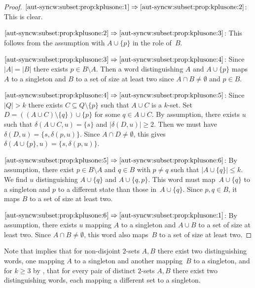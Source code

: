 \begin{proof}
	$\ref{aut-syncw:subset:prop:kplusone:1} \Rightarrow \ref{aut-syncw:subset:prop:kplusone:2}$: This is clear.	
	
	$\ref{aut-syncw:subset:prop:kplusone:2} \Rightarrow \ref{aut-syncw:subset:prop:kplusone:3}$: This follows from the assumption with $A \cup \{p\}$ in the role of~$B$.
	
	$\ref{aut-syncw:subset:prop:kplusone:3} \Rightarrow \ref{aut-syncw:subset:prop:kplusone:4}$: Since $|A| = |B|$
	there exists $p \in B \setminus A$.
	Then a word distinguishing $A$ and $A \cup \{p\}$
	maps $A$ to a singleton and $B$ to a set of size at least two
	since $A \cap B \ne \emptyset$ and $p \in B$.
	
	$\ref{aut-syncw:subset:prop:kplusone:4} \Rightarrow \ref{aut-syncw:subset:prop:kplusone:5}$: Since $|Q| > k$
	there exists $C \subseteq Q \setminus \{p\}$ such that $A \cup C$ is a $k$-set.
	Set $D = ( ( A \cup C ) \setminus \{q\} ) \cup \{p\}$ for some $q \in A \cup C$.	
	By assumption, there exists $u$ such that $\delta(A \cup C, u) = \{s\}$
	and $|\delta(D, u)| \ge 2$. Then we must have $\delta(D, u) = \{s, \delta(p, u)\}$.
	Since $A \cap D \ne \emptyset$,
	this gives $\delta(A \cup \{p\}, u) = \{s, \delta(p, u)\}$.
		
	$\ref{aut-syncw:subset:prop:kplusone:5} \Rightarrow \ref{aut-syncw:subset:prop:kplusone:6}$: By assumption, 
	there exist $p \in B \setminus A$ and $q \in B$ with $p \ne q$
	such that $|A \cup\{q\}| \le k$.	
	We find $u$ distinguishing $A \cup \{q\}$ and $A \cup \{q,p\}$.
	This word must map~$A \cup \{q\}$ to a singleton and $p$ to a different state than those in~$A \cup \{q\}$.
	Since $p,q \in B$, it maps $B$ to a set of size at least two.	
	
	$\ref{aut-syncw:subset:prop:kplusone:6} \Rightarrow \ref{aut-syncw:subset:prop:kplusone:1}$: By assumption, 
	there exists $u$ mapping $A$ to a singleton and $A \cup B$ to a set of size at least two.
	Since $A \cap B \ne \emptyset$, this word also maps~$B$ to a set of size at least two.
\end{proof}

Note that 
implies that for non-disjoint $2$-sets $A,B$
there exist two distinguishing words, one mapping $A$ to a singleton
and another mapping~$B$ to a singleton, and for $k \ge 3$
by ,
that for every pair of distinct $2$-sets $A,B$
there exist two distinguishing words, each mapping a different
set to a singleton.

